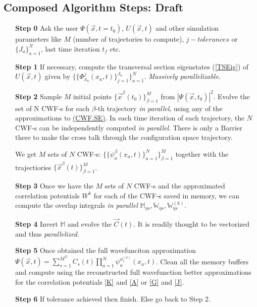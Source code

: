 \documentclass[11pt, a4paper]{article} %
\begin{document}
\subsection{Composed Algorithm Steps: Draft}
\begin{enumerate}
\item[{\bf Step 0}] Ask the user $\Psi(\vec{x},t=t_0)$, $U(\vec{x},t)$ and other simulation parameters like $M$ (number of trajectories to compute), $j-tolerances$ or $\{J_a\}_{a=1}^N$, last time iteration $t_f$ etc.

\item[{\bf Step 1}] If necessary, compute the transversal section eigenstates (\ref{TSEig}) of $U(\vec{x},t)$ given by $\{\{ \Phi_{x_a}^j(x_a,t)\}_{j=1}^{J_a}\}_{a=1}^N$. \textit{Massively parallelizable}.

\item[{\bf Step 2}] Sample $M$ initial points $\{\vec{x}^\beta(t_0)\}_{\beta=1}^M$ from $|\Psi(\vec{x},t_0)|^2$. Evolve the set of N CWF-s for each $\beta$-th trajectory \textit{in parallel}, using any of the approximations to \hyperref[CWF.SE]{(CWF.SE)}. In each time iteration of each trajectory, the $N$  CWF-s can be independently computed {\em in parallel}. There is only a Barrier there to make the cross talk through the configuration space trajectory.

We get $M$ sets of $N$ CWF-s: $\{\{\psi^\beta_a(x_a,t)\}_{a=1}^N\}_{\beta=1}^M$ together with the trajectiories $\{ \vec{x}^\beta(t)\}_{\beta=1}^M$.


\item[{\bf Step 3}] Once we have the $M$ sets of $N$ CWF-s and the approximated correlation potentials $W^{k}$ for each of the CWF-s saved in memory, we can compute the overlap integrals {\em in parallel} $\mathbb{M}_{\eta s}, \mathbb{W}_{\eta s}, \mathbb{W}^{(k)}_{\eta s}$.


\item[{\bf Step 4}] Invert $\mathbb{M}$ and evolve the $\vec{C}(t)$. It is readily thought to be vectorized and thus {\em parallelized}.


\item[{\bf Step 5}] Once obtained the full wavefunciton approximation $\Psi(\vec{x},t)= \sum_{s=1}^{M^N} C_s(t) \prod_{a=1}^N \psi_a^{\sigma^{(a)}_s}(x_a,t)$. Clean all the memory buffers and compute using the reconstructed full wavefunction better approximations for the correlation potentials \ref{K} and \ref{A} or \ref{G} and \ref{J}.

\item[{\bf Step 6}] If tolerance achieved then finish. Else go back to Step 2.
\end{enumerate}
\end{document}
